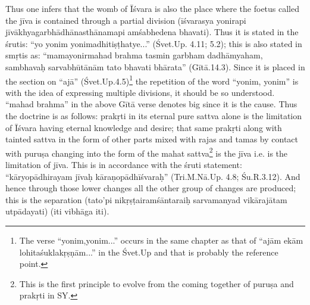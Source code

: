 Thus one infers that the womb of Īśvara is also the place where the foetus called the jīva is contained through a partial division (īśvarasya yonirapi jīvākhyagarbhādhānasthānamapi amśabhedena bhavati). Thus it is stated in the śrutis: “yo yonim yonimadhitiṣṭhatye...” (Śvet.Up. 4.11; 5.2); this is also stated in smṛtis as: “mamayonirmahad brahma tasmin garbham dadhāmyaham, sambhavaḥ sarvabhūtānām tato bhavati bhārata” (Gītā.14.3). Since it is placed in the section on “ajā” (Śvet.\-Up.4.5)\footnote{The verse “yonim,yonim...” occurs in the same chapter as that of “ajām ekām lohitaśuklakṛṣṇām...” in the Śvet.Up and that is probably the reference point.} the repetition of the word “yonim, yonim” is with the idea of expressing multiple divisions, it should be so understood. “mahad brahma” in the above Gītā verse denotes big since it is the cause. Thus the doctrine is as follows: prakṛti in its eternal pure sattva alone is the limitation of Īśvara having eternal knowledge and desire; that same prakṛti along with tainted sattva in the form of other parts mixed with rajas and tamas by contact with puruṣa changing into the form of the mahat sattva\footnote{This is the first principle to evolve from the coming together of puruṣa and prakṛti in SY.} is the jīva i.e. is the limitation of jīva. This is in accordance with the śruti statement: “kāryopādhirayam jīvaḥ kāraṇopādhīśvaraḥ” (Tri.M.Nā.Up. 4.8; Śu.R.3.12). And hence  through those lower changes all the other group of changes are produced; this is the separation (tato’pi nikṛṣṭairamśāntaraiḥ sarvamanyad vikārajātam utpādayati) (iti vibhāga iti).

\smallskip

\textbf{}


\smallskip

